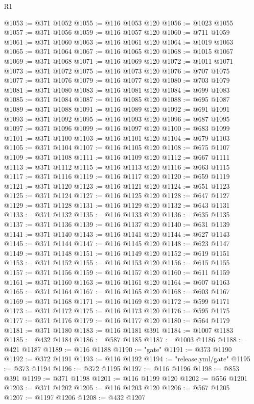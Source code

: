 \begin{lexlean}{R1}
\begin{coremodule}
@1053 := @371 @1052
@1055 := @116 @1053 @120
@1056 := @1023 @1055
@1057 := @371 @1056
@1059 := @116 @1057 @120
@1060 := @711 @1059
@1061 := @371 @1060
@1063 := @116 @1061 @120
@1064 := @1019 @1063
@1065 := @371 @1064
@1067 := @116 @1065 @120
@1068 := @1015 @1067
@1069 := @371 @1068
@1071 := @116 @1069 @120
@1072 := @1011 @1071
@1073 := @371 @1072
@1075 := @116 @1073 @120
@1076 := @707 @1075
@1077 := @371 @1076
@1079 := @116 @1077 @120
@1080 := @703 @1079
@1081 := @371 @1080
@1083 := @116 @1081 @120
@1084 := @699 @1083
@1085 := @371 @1084
@1087 := @116 @1085 @120
@1088 := @695 @1087
@1089 := @371 @1088
@1091 := @116 @1089 @120
@1092 := @691 @1091
@1093 := @371 @1092
@1095 := @116 @1093 @120
@1096 := @687 @1095
@1097 := @371 @1096
@1099 := @116 @1097 @120
@1100 := @683 @1099
@1101 := @371 @1100
@1103 := @116 @1101 @120
@1104 := @679 @1103
@1105 := @371 @1104
@1107 := @116 @1105 @120
@1108 := @675 @1107
@1109 := @371 @1108
@1111 := @116 @1109 @120
@1112 := @667 @1111
@1113 := @371 @1112
@1115 := @116 @1113 @120
@1116 := @663 @1115
@1117 := @371 @1116
@1119 := @116 @1117 @120
@1120 := @659 @1119
@1121 := @371 @1120
@1123 := @116 @1121 @120
@1124 := @651 @1123
@1125 := @371 @1124
@1127 := @116 @1125 @120
@1128 := @647 @1127
@1129 := @371 @1128
@1131 := @116 @1129 @120
@1132 := @643 @1131
@1133 := @371 @1132
@1135 := @116 @1133 @120
@1136 := @635 @1135
@1137 := @371 @1136
@1139 := @116 @1137 @120
@1140 := @631 @1139
@1141 := @371 @1140
@1143 := @116 @1141 @120
@1144 := @627 @1143
@1145 := @371 @1144
@1147 := @116 @1145 @120
@1148 := @623 @1147
@1149 := @371 @1148
@1151 := @116 @1149 @120
@1152 := @619 @1151
@1153 := @371 @1152
@1155 := @116 @1153 @120
@1156 := @615 @1155
@1157 := @371 @1156
@1159 := @116 @1157 @120
@1160 := @611 @1159
@1161 := @371 @1160
@1163 := @116 @1161 @120
@1164 := @607 @1163
@1165 := @371 @1164
@1167 := @116 @1165 @120
@1168 := @603 @1167
@1169 := @371 @1168
@1171 := @116 @1169 @120
@1172 := @599 @1171
@1173 := @371 @1172
@1175 := @116 @1173 @120
@1176 := @595 @1175
@1177 := @371 @1176
@1179 := @116 @1177 @120
@1180 := @564 @1179
@1181 := @371 @1180
@1183 := @116 @1181 @391
@1184 := @1007 @1183
@1185 := @432 @1184
@1186 := @587 @1185
@1187 := @1003 @1186
@1188 := @421 @1187
@1189 := @116 @1188
@1190 := "gate"
@1191 := @373 @1190
@1192 := @372 @1191
@1193 := @116 @1192
@1194 := "release.yml/gate"
@1195 := @373 @1194
@1196 := @372 @1195
@1197 := @116 @1196
@1198 := @853 @391
@1199 := @371 @1198
@1201 := @116 @1199 @120
@1202 := @556 @1201
@1203 := @371 @1202
@1205 := @116 @1203 @120
@1206 := @567 @1205
@1207 := @1197 @1206
@1208 := @432 @1207

\end{coremodule}
\end{lexlean}
